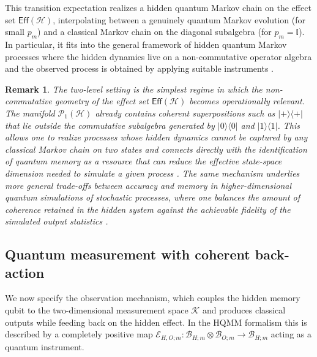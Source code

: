 \documentclass[12pt, reco]{article}
\newtheorem{remark}[theorem]{Remark}
\begin{document}
This transition expectation realizes a hidden quantum Markov chain on the effect set \(\mathsf{Eff}(\mathcal{H})\), interpolating between a genuinely quantum Markov evolution (for small \(p_m\)) and a classical Markov chain on the diagonal subalgebra (for \(p_m = \mathbb{I}\)). In particular, it fits into the general framework of hidden quantum Markov processes where the hidden dynamics live on a non-commutative operator algebra and the observed process is obtained by applying suitable instruments \cite{AGLS24Q}.

\begin{remark}
The two-level setting is the simplest regime in which the non-commutative geometry of the effect set \(\mathsf{Eff}(\mathcal{H})\) becomes operationally relevant. The manifold \(\mathcal{P}_1(\mathcal{H})\) already contains coherent superpositions such as \(|+\rangle\langle+|\) that lie outside the commutative subalgebra generated by \(|0\rangle\langle0|\) and \(|1\rangle\langle1|\). This allows one to realize processes whose hidden dynamics cannot be captured by any classical Markov chain on two states and connects directly with the identification of quantum memory as a resource that can reduce the effective state-space dimension needed to simulate a given process \cite{Elliot21}. The same mechanism underlies more general trade-offs between accuracy and memory in higher-dimensional quantum simulations of stochastic processes, where one balances the amount of coherence retained in the hidden system against the achievable fidelity of the simulated output statistics \cite{Banchi24}.
\end{remark}

\subsection{Quantum measurement with coherent back-action}

We now specify the observation mechanism, which couples the hidden memory qubit to the two-dimensional measurement space \(\mathcal{K}\) and produces classical outputs while feeding back on the hidden effect. In the HQMM formalism this is described by a completely positive map \(\mathcal{E}_{H,O;m}:\mathcal{B}_{H;m}\otimes\mathcal{B}_{O;m}\to\mathcal{B}_{H;m}\) acting as a quantum instrument.
\end{document}
